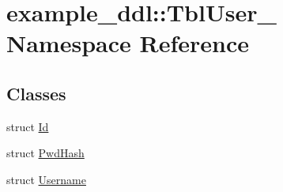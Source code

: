 \hypertarget{namespaceexample__ddl_1_1TblUser__}{}\section{example\+\_\+ddl\+:\+:Tbl\+User\+\_\+ Namespace Reference}
\label{namespaceexample__ddl_1_1TblUser__}
\subsection*{Classes}
\begin{DoxyCompactItemize}
\item 
struct \hyperlink{structexample__ddl_1_1TblUser___1_1Id}{Id}
\item 
struct \hyperlink{structexample__ddl_1_1TblUser___1_1PwdHash}{Pwd\+Hash}
\item 
struct \hyperlink{structexample__ddl_1_1TblUser___1_1Username}{Username}
\end{DoxyCompactItemize}
